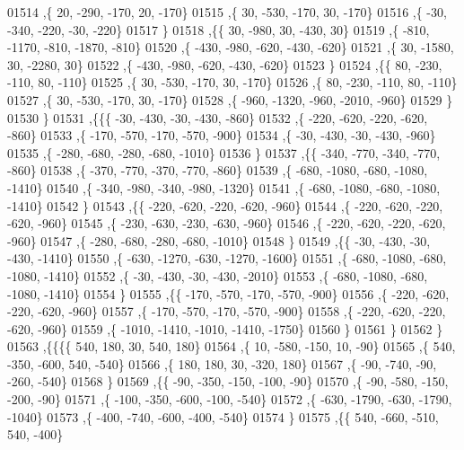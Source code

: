 \begin{DoxyCode}
01514     ,\{    20,  -290,  -170,    20,  -170\}
01515     ,\{    30,  -530,  -170,    30,  -170\}
01516     ,\{   -30,  -340,  -220,   -30,  -220\}
01517     \}
01518    ,\{\{    30,  -980,    30,  -430,    30\}
01519     ,\{  -810, -1170,  -810, -1870,  -810\}
01520     ,\{  -430,  -980,  -620,  -430,  -620\}
01521     ,\{    30, -1580,    30, -2280,    30\}
01522     ,\{  -430,  -980,  -620,  -430,  -620\}
01523     \}
01524    ,\{\{    80,  -230,  -110,    80,  -110\}
01525     ,\{    30,  -530,  -170,    30,  -170\}
01526     ,\{    80,  -230,  -110,    80,  -110\}
01527     ,\{    30,  -530,  -170,    30,  -170\}
01528     ,\{  -960, -1320,  -960, -2010,  -960\}
01529     \}
01530    \}
01531   ,\{\{\{   -30,  -430,   -30,  -430,  -860\}
01532     ,\{  -220,  -620,  -220,  -620,  -860\}
01533     ,\{  -170,  -570,  -170,  -570,  -900\}
01534     ,\{   -30,  -430,   -30,  -430,  -960\}
01535     ,\{  -280,  -680,  -280,  -680, -1010\}
01536     \}
01537    ,\{\{  -340,  -770,  -340,  -770,  -860\}
01538     ,\{  -370,  -770,  -370,  -770,  -860\}
01539     ,\{  -680, -1080,  -680, -1080, -1410\}
01540     ,\{  -340,  -980,  -340,  -980, -1320\}
01541     ,\{  -680, -1080,  -680, -1080, -1410\}
01542     \}
01543    ,\{\{  -220,  -620,  -220,  -620,  -960\}
01544     ,\{  -220,  -620,  -220,  -620,  -960\}
01545     ,\{  -230,  -630,  -230,  -630,  -960\}
01546     ,\{  -220,  -620,  -220,  -620,  -960\}
01547     ,\{  -280,  -680,  -280,  -680, -1010\}
01548     \}
01549    ,\{\{   -30,  -430,   -30,  -430, -1410\}
01550     ,\{  -630, -1270,  -630, -1270, -1600\}
01551     ,\{  -680, -1080,  -680, -1080, -1410\}
01552     ,\{   -30,  -430,   -30,  -430, -2010\}
01553     ,\{  -680, -1080,  -680, -1080, -1410\}
01554     \}
01555    ,\{\{  -170,  -570,  -170,  -570,  -900\}
01556     ,\{  -220,  -620,  -220,  -620,  -960\}
01557     ,\{  -170,  -570,  -170,  -570,  -900\}
01558     ,\{  -220,  -620,  -220,  -620,  -960\}
01559     ,\{ -1010, -1410, -1010, -1410, -1750\}
01560     \}
01561    \}
01562   \}
01563  ,\{\{\{\{   540,   180,    30,   540,   180\}
01564     ,\{    10,  -580,  -150,    10,   -90\}
01565     ,\{   540,  -350,  -600,   540,  -540\}
01566     ,\{   180,   180,    30,  -320,   180\}
01567     ,\{   -90,  -740,   -90,  -260,  -540\}
01568     \}
01569    ,\{\{   -90,  -350,  -150,  -100,   -90\}
01570     ,\{   -90,  -580,  -150,  -200,   -90\}
01571     ,\{  -100,  -350,  -600,  -100,  -540\}
01572     ,\{  -630, -1790,  -630, -1790, -1040\}
01573     ,\{  -400,  -740,  -600,  -400,  -540\}
01574     \}
01575    ,\{\{   540,  -660,  -510,   540,  -400\}

\end{DoxyCode}
